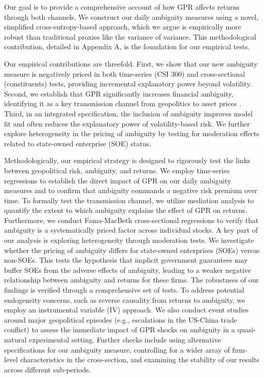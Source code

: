 \documentclass[preprint,12pt,authoryear]{elsarticle}
\begin{document}
Our goal is to provide a comprehensive account of how GPR affects returns through both channels. We construct our daily ambiguity measures using a novel, simplified cross-entropy-based approach, which we argue is empirically more robust than traditional proxies like the variance of variance. This methodological contribution, detailed in Appendix A, is the foundation for our empirical tests.

Our empirical contributions are threefold. First, we show that our new ambiguity measure is negatively priced in both time-series (CSI 300) and cross-sectional (constituents) tests, providing incremental explanatory power beyond volatility. Second, we establish that GPR significantly increases financial ambiguity, identifying it as a key transmission channel from geopolitics to asset prices \citep{caldara2022measuring}. Third, in an integrated specification, the inclusion of ambiguity improves model fit and often reduces the explanatory power of volatility-based risk. We further explore heterogeneity in the pricing of ambiguity by testing for moderation effects related to state-owned enterprise (SOE) status.

Methodologically, our empirical strategy is designed to rigorously test the links between geopolitical risk, ambiguity, and returns. We employ time-series regressions to establish the direct impact of GPR on our daily ambiguity measures and to confirm that ambiguity commands a negative risk premium over time. To formally test the transmission channel, we utilize mediation analysis to quantify the extent to which ambiguity explains the effect of GPR on returns. Furthermore, we conduct Fama-MacBeth cross-sectional regressions to verify that ambiguity is a systematically priced factor across individual stocks. A key part of our analysis is exploring heterogeneity through moderation tests. We investigate whether the pricing of ambiguity differs for state-owned enterprises (SOEs) versus non-SOEs. This tests the hypothesis that implicit government guarantees may buffer SOEs from the adverse effects of ambiguity, leading to a weaker negative relationship between ambiguity and returns for these firms. The robustness of our findings is verified through a comprehensive set of tests. To address potential endogeneity concerns, such as reverse causality from returns to ambiguity, we employ an instrumental variable (IV) approach. We also conduct event studies around major geopolitical episodes (e.g., escalations in the US-China trade conflict) to assess the immediate impact of GPR shocks on ambiguity in a quasi-natural experimental setting. Further checks include using alternative specifications for our ambiguity measure, controlling for a wider array of firm-level characteristics in the cross-section, and examining the stability of our results across different sub-periods.
\end{document}
